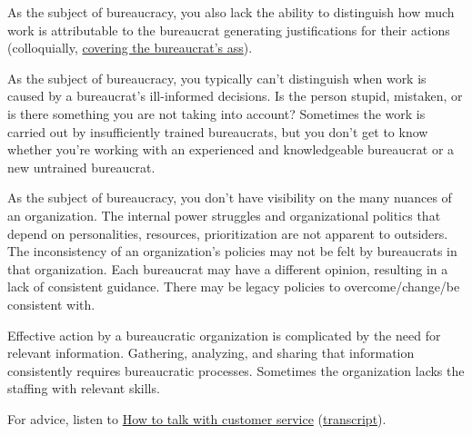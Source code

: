 As the subject of bureaucracy, you also lack the ability to distinguish how much work is attributable to the bureaucrat generating justifications for their actions (colloquially, \href{https://en.wikipedia.org/wiki/Cover_your_ass}{covering the bureaucrat's ass}). 

As the subject of bureaucracy, you typically can't distinguish when work is caused by a bureaucrat's ill-informed decisions. Is the person stupid, mistaken, or is there something you are not taking into account?
Sometimes the work is carried out by insufficiently trained bureaucrats, but you don't get to know whether you're working with an experienced and knowledgeable bureaucrat or a new untrained bureaucrat. 

As the subject of bureaucracy, you don't have visibility on the many nuances of an organization. The internal power struggles and organizational politics that depend on personalities, resources, prioritization are not apparent to outsiders.
The inconsistency of an organization's policies may not be felt by bureaucrats in that organization. Each bureaucrat may have a different opinion, resulting in a lack of consistent guidance.
There may be legacy policies to overcome/change/be consistent with.

Effective action by a bureaucratic organization is complicated by the need for relevant information. Gathering, analyzing, and sharing that information consistently requires bureaucratic processes. Sometimes the organization lacks the staffing with relevant skills. 


For advice, listen to \href{https://www.npr.org/2022/03/16/1086915600/get-what-you-want-customer-service}{How to talk with customer service} (\href{https://www.npr.org/transcripts/1086915600}{transcript}).


